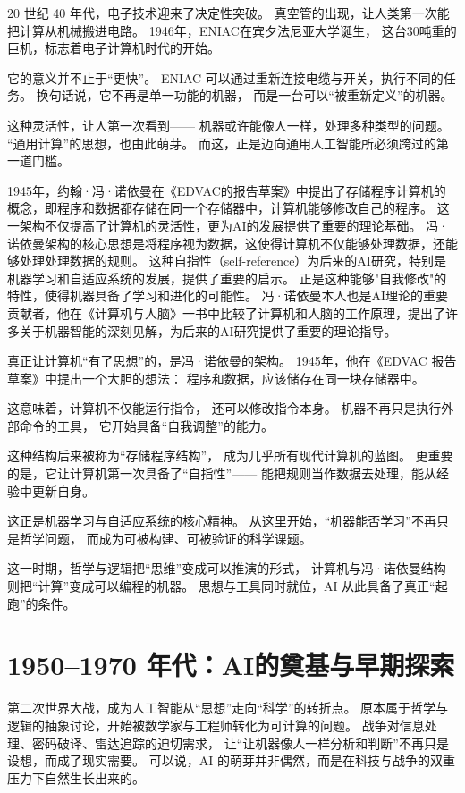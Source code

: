 20 世纪 40 年代，电子技术迎来了决定性突破。
真空管的出现，让人类第一次能把计算从机械搬进电路。
1946年，ENIAC在宾夕法尼亚大学诞生，
这台30吨重的巨机，标志着电子计算机时代的开始。

它的意义并不止于“更快”。
ENIAC 可以通过重新连接电缆与开关，执行不同的任务。
换句话说，它不再是单一功能的机器，
而是一台可以“被重新定义”的机器。

这种灵活性，让人第一次看到——
机器或许能像人一样，处理多种类型的问题。
“通用计算”的思想，也由此萌芽。
而这，正是迈向通用人工智能所必须跨过的第一道门槛。

1945年，约翰·冯·诺依曼在《EDVAC的报告草案》中提出了存储程序计算机的概念，即程序和数据都存储在同一个存储器中，计算机能够修改自己的程序。
这一架构不仅提高了计算机的灵活性，更为AI的发展提供了重要的理论基础。
冯·诺依曼架构的核心思想是将程序视为数据，这使得计算机不仅能够处理数据，还能够处理处理数据的规则。
这种自指性（self-reference）为后来的AI研究，特别是机器学习和自适应系统的发展，提供了重要的启示。
正是这种能够"自我修改"的特性，使得机器具备了学习和进化的可能性。
冯·诺依曼本人也是AI理论的重要贡献者，他在《计算机与人脑》一书中比较了计算机和人脑的工作原理，提出了许多关于机器智能的深刻见解，为后来的AI研究提供了重要的理论指导。

真正让计算机“有了思想”的，是冯·诺依曼的架构。
1945年，他在《EDVAC 报告草案》中提出一个大胆的想法：
程序和数据，应该储存在同一块存储器中。

这意味着，计算机不仅能运行指令，
还可以修改指令本身。
机器不再只是执行外部命令的工具，
它开始具备“自我调整”的能力。

这种结构后来被称为“存储程序结构”，
成为几乎所有现代计算机的蓝图。
更重要的是，它让计算机第一次具备了“自指性”——
能把规则当作数据去处理，能从经验中更新自身。

这正是机器学习与自适应系统的核心精神。
从这里开始，“机器能否学习”不再只是哲学问题，
而成为可被构建、可被验证的科学课题。

这一时期，哲学与逻辑把“思维”变成可以推演的形式，
计算机与冯·诺依曼结构则把“计算”变成可以编程的机器。
思想与工具同时就位，AI 从此具备了真正“起跑”的条件。

\section{1950–1970 年代：AI的奠基与早期探索}

第二次世界大战，成为人工智能从“思想”走向“科学”的转折点。
原本属于哲学与逻辑的抽象讨论，开始被数学家与工程师转化为可计算的问题。
战争对信息处理、密码破译、雷达追踪的迫切需求，
让“让机器像人一样分析和判断”不再只是设想，而成了现实需要。
可以说，AI 的萌芽并非偶然，而是在科技与战争的双重压力下自然生长出来的。

